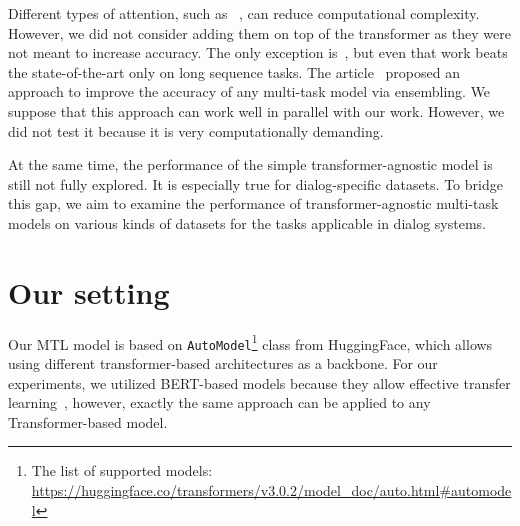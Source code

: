 
Different types of attention, such as ~\cite{reformer}, can reduce computational complexity. However, we did not consider adding them on top of the transformer as they were not meant to increase accuracy. The only exception is~\cite{routing_transformers}, but even that work beats the state-of-the-art only on long sequence tasks.%
The article~\cite{Multi-taskEnsemble:19} proposed an approach to improve the accuracy of any multi-task model via ensembling. We suppose that this approach can work well in parallel with our work. However, we did not test it because it is very computationally demanding.


At the same time, the performance of the simple transformer-agnostic model is still not fully explored. It is especially true for dialog-specific datasets. To bridge this gap, we aim to examine the performance of transformer-agnostic multi-task models on various kinds of datasets for the tasks applicable in dialog systems.
\section{Our setting}


Our MTL model is based on \texttt{AutoModel}\footnote{The list of supported models: \url{https://huggingface.co/transformers/v3.0.2/model_doc/auto.html\#automodel}} class from HuggingFace, which allows using different transformer-based architectures as a backbone. For our experiments, we utilized BERT-based models because they allow effective transfer learning~\cite{10.1007/978-3-031-19032-2_46, ksquad}, however, exactly the same approach can be applied to any Transformer-based model.

